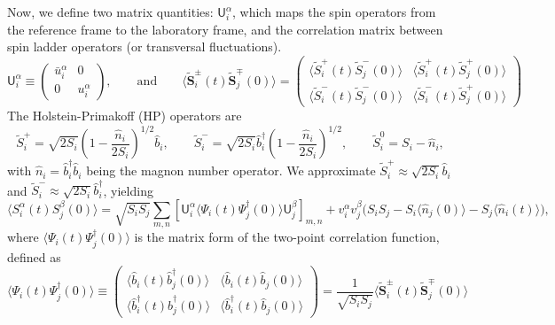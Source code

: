 \documentclass[aps, prx, nofootinbib, superscriptaddress]{revtex4-2}
\begin{document}
Now, we define two matrix quantities: $\mathsf{U}^{\alpha}_{i}$, which maps the spin operators from the reference frame to the laboratory frame, and the correlation matrix between spin ladder operators (or transversal fluctuations).
\begin{equation}
    \mathsf{U}^{\alpha}_{i} 
    \equiv 
    \begin{pmatrix}
         \bar{u}^{\alpha}_{i} & 0 \\ 0 & u^{\alpha}_{i} 
    \end{pmatrix},
    \qquad \text{and} \qquad
    \big\langle \widetilde{\mathbf{S}}^{\pm}_{i}(t) \widetilde{\mathbf{S}}^{\mp}_{j}(0) \big\rangle
    = 
    \begin{pmatrix}
        \langle \widetilde{S}^{+}_{i}(t) \widetilde{S}^{-}_{j}(0) \rangle &
        \langle \widetilde{S}^{+}_{i}(t) \widetilde{S}^{+}_{j}(0) \rangle \\[0.25em]
        \langle \widetilde{S}^{-}_{i}(t) \widetilde{S}^{-}_{j}(0) \rangle &
        \langle \widetilde{S}^{-}_{i}(t) \widetilde{S}^{+}_{j}(0) \rangle
    \end{pmatrix}
\end{equation}
The Holstein-Primakoff (HP) operators are
\begin{equation}
    \widetilde{S}_{i}^{+} = \sqrt{2 S_i} \left( 1 - \frac{\hat{n}_i}{2 S_i} \right)^{1/2} \hat{b}_i, 
    \qquad \widetilde{S}_{i}^{-} = \sqrt{2 S_i} \hat{b}_i^{\dagger} \left( 1 - \frac{\hat{n}_i}{2 S_i} \right)^{1/2}, 
    \qquad \widetilde{S}_{i}^{0} = S_i - \hat{n}_i,
\end{equation}
with $\hat{n}_i = \hat{b}_i^{\dagger} \hat{b}_i$ being the magnon number operator.
We approximate $\widetilde{S}_{i}^{+} \approx \sqrt{2 S_i} \hat{b}_i$ and $\widetilde{S}_{i}^{-} \approx \sqrt{2 S_i} \hat{b}_i^{\dagger}$, yielding
\begin{equation}
    \langle S_i^{\alpha}(t) S_j^{\beta}(0) \rangle
    = \sqrt{S_i S_j} \sum_{m,n} \left[ 
    \mathsf{U}^{\alpha}_{i}
    \big\langle \Psi_{i}(t) \Psi_{j}^{\dagger}(0) \big\rangle
    \mathsf{U}^{\beta}_{j}
    \right]_{m,n}
    + v^{\alpha}_{i} v^{\beta}_{j} \big( S_i S_j -  S_i \langle \hat{n}_j(0) \rangle - S_j \langle \hat{n}_i(t) \rangle \big),
\end{equation}
where $\big\langle \Psi_{i}(t) \Psi_{j}^{\dagger}(0) \big\rangle$ is the matrix form of the two-point correlation function, defined as 
\begin{equation}
    \big\langle \Psi_{i}(t) \Psi_{j}^{\dagger}(0) \big\rangle
    \equiv
    \begin{pmatrix}
        \langle \hat{b}_i(t) \hat{b}_j^{\dagger}(0) \rangle &
        \langle \hat{b}_i(t) \hat{b}_j(0) \rangle \\
        \langle \hat{b}_i^{\dagger}(t) \hat{b}_j^{\dagger}(0) \rangle &
        \langle \hat{b}_i^{\dagger}(t) \hat{b}_j(0) \rangle
    \end{pmatrix}
    = \frac{1}{\sqrt{S_{i}S_{j}}}
    \big\langle \widetilde{\mathbf{S}}^{\pm}_{i}(t) \widetilde{\mathbf{S}}^{\mp}_{j}(0) \big\rangle
\end{equation}
\end{document}
